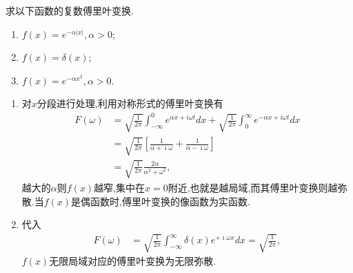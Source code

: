 \begin{example}
求以下函数的复数傅里叶变换.
\begin{enumerate}
    \item $f(x) = e^{-\alpha |x|}, \alpha > 0$;
    \item $f(x) = \delta (x)$;
    \item $f(x) = e^{-\alpha x^2}, \alpha > 0$.
\end{enumerate}
\end{example}
\begin{solution}
\begin{enumerate}
    \item 对$x$分段进行处理,利用对称形式的傅里叶变换有
    \begin{align}
        F(\omega) &=
        \sqrt{\frac{1}{2 \pi}} \int_{-\infty}^0 e^{\alpha x+i \omega t} dx \nonumber
        +
        \sqrt{\frac{1}{2 \pi}} \int_0^{\infty} e^{-\alpha x+i \omega t} dx  \nonumber
        \\
        &= \sqrt{\frac{1}{2 \pi}} \left[\frac{1}{\alpha + \imath \omega } + \frac{1}{\alpha - \imath \omega } \right] \nonumber
        \\
        &= \sqrt{\frac{1}{2 \pi}} \frac{2\alpha}{\alpha^2 + \omega^2}, \nonumber
    \end{align}
    越大的$\alpha$则$f(x)$越窄,集中在$x=0$附近,也就是越局域,而其傅里叶变换则越弥散.当$f(x)$是偶函数时,傅里叶变换的像函数为实函数.

    \item 代入
    \begin{align}
        F(\omega) &=
        \sqrt{\frac{1}{2 \pi}} \int_{-\infty}^{\infty} \delta(x) e^{+\imath \omega x} d x = \sqrt{\frac{1}{2 \pi}} ,
    \end{align}
    $f(x)$无限局域对应的傅里叶变换为无限弥散.


\end{enumerate}
\end{solution}
